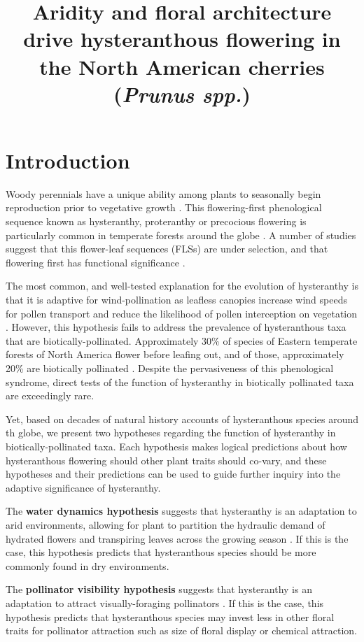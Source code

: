 \documentclass{article}\usepackage[]{graphicx}\usepackage[]{color}
\title{Aridity and floral architecture drive hysteranthous flowering in the North American cherries (\textit{Prunus spp.})}
\begin{document}
\maketitle


\section*{Introduction}
\noindent Woody perennials have a unique ability among plants to seasonally begin reproduction prior to vegetative growth \citep{}. This flowering-first phenological sequence known as hysteranthy, proteranthy or precocious flowering is particularly common in temperate forests around the globe \citep{}. A number of studies suggest that this flower-leaf sequences (FLSs) are under selection, and that flowering first has functional significance \citep{}.

\noindent The most common, and well-tested explanation for the evolution of hysteranthy is that it is adaptive for wind-pollination as leafless canopies increase wind speeds for pollen transport and reduce the likelihood of pollen interception on vegetation \citep{}. However, this hypothesis fails to address the prevalence of hysteranthous taxa that are biotically-pollinated. Approximately 30\% of species of Eastern temperate forests of North America flower before leafing out, and of those, approximately 20\% are biotically pollinated  \citep{}. Despite the pervasiveness of this phenological syndrome, direct tests of the function of hysteranthy in biotically pollinated taxa are exceedingly rare.

\noindent Yet, based on decades of natural history accounts of hysteranthous species around th globe, we present two hypotheses regarding the function of hysteranthy in biotically-pollinated taxa. Each hypothesis makes logical predictions about how hysteranthous flowering should other plant traits should co-vary, and these hypotheses and their predictions can be used to guide further inquiry into the adaptive significance of hysteranthy.

The \textbf{water dynamics hypothesis} suggests that hysteranthy is an adaptation to arid environments, allowing for plant to partition the hydraulic demand of hydrated flowers and transpiring leaves across the growing season \citep{}. If this is the case, this hypothesis predicts that hysteranthous species should be more commonly found in dry environments.  

The \textbf{pollinator visibility hypothesis} suggests that hysteranthy is an adaptation to attract visually-foraging pollinators \citep{}. If this is the case, this hypothesis predicts that hysteranthous species may invest less in other floral traits for pollinator attraction such as size of floral display or chemical attraction. 
\end{document}
